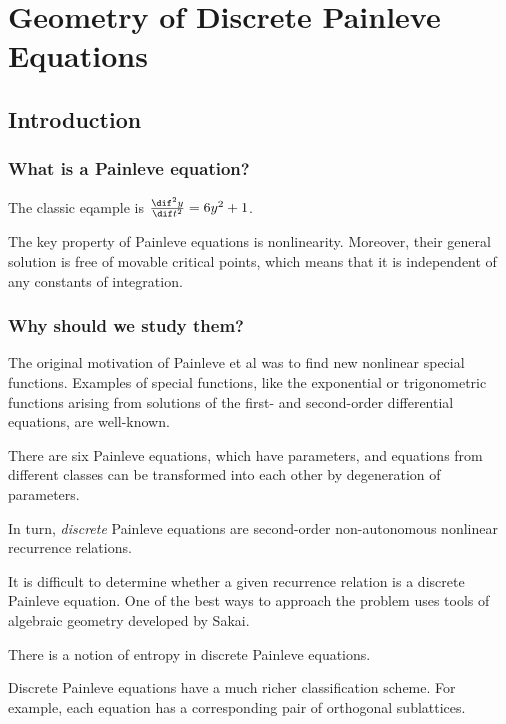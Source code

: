\documentclass[11pt]{scrartcl}
\begin{document}
  \section{Geometry of Discrete Painleve Equations}

  \subsection{Introduction}

  \subsubsection{What is a Painleve equation?}

  The classic eqample is $\frac{\dif^{2}y }{\dif t^{2}} = 6y^{2} + 1$.

  The key property of Painleve equations is nonlinearity. Moreover,
  their general solution is free of movable critical points, which
  means that it is independent of any constants of integration.


  \subsubsection{Why should we study them?}

  The original motivation of Painleve et al was to find new nonlinear
  special functions. Examples of special functions, like the
  exponential or trigonometric functions arising from solutions of the
  first- and second-order differential equations, are well-known.

  There are six Painleve equations, which have parameters, and
  equations from different classes can be transformed into each other
  by degeneration of parameters.

  In turn, \textit{discrete} Painleve equations are second-order non-autonomous
  nonlinear recurrence relations.

  It is difficult to determine whether a given recurrence relation is
  a discrete Painleve equation. One of the best ways to approach the
  problem uses tools of algebraic geometry developed by Sakai.

  \begin{note*}
    There is a notion of entropy in discrete Painleve equations.
  \end{note*}

  Discrete Painleve equations have a much richer classification
  scheme. For example, each equation has a corresponding pair of orthogonal
  sublattices.
\end{document}
